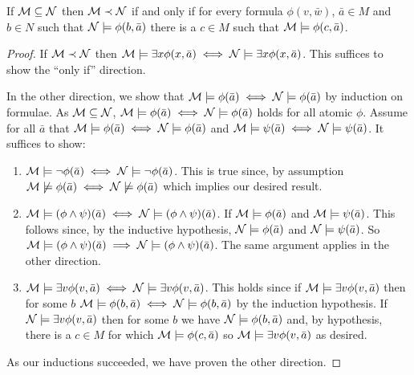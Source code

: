 \begin{theorem}\label{theorem_tarski_vaught_test}
If \(\mathcal{M} \subseteq \mathcal{N}\) then \(\mathcal{M} \prec \mathcal{N}\) if and only if for every formula \(\phi(v, \bar{w})\), \(\bar{a} \in M\) and \(b \in N\) such that \(\mathcal{N} \models \phi(b, \bar{a})\) there is a \(c \in M\) such that \(\mathcal{M} \models \phi(c, \bar{a})\).
\end{theorem}

\begin{proof}
If \(\mathcal{M} \prec \mathcal{N}\) then \(\mathcal{M} \models \exists x \phi(x, \bar{a}) \iff \mathcal{N} \models \exists x \phi(x, \bar{a})\). This suffices to show the ``only if'' direction.

In the other direction, we show that \(\mathcal{M} \models \phi(\bar{a}) \iff \mathcal{N} \models \phi(\bar{a})\) by induction on formulae. 
As \(\mathcal{M} \subseteq \mathcal{N}\), \(\mathcal{M} \models \phi(\bar{a}) \iff \mathcal{N} \models \phi(\bar{a})\) holds for all atomic \(\phi\).
Assume for all \(\bar{a}\) that  \(\mathcal{M} \models \phi(\bar{a}) \iff \mathcal{N} \models \phi(\bar{a})\) and \(\mathcal{M} \models \psi(\bar{a}) \iff \mathcal{N} \models \psi(\bar{a})\).
It suffices to show:
\begin{enumerate}
\item \(\mathcal{M} \models \neg \phi(\bar{a}) \iff \mathcal{N} \models \neg \phi(\bar{a})\). This is true since, by assumption \(\mathcal{M} \not \models \phi(\bar{a}) \iff \mathcal{N} \not \models \phi(\bar{a})\) which implies our desired result. 
\item \(\mathcal{M} \models (\phi\land\psi)(\bar{a}) \iff \mathcal{N} \models (\phi\land\psi)(\bar{a})\). If \(\mathcal{M} \models \phi(\bar{a})\) and \(\mathcal{M} \models \psi(\bar{a})\). This follows since, by the inductive hypothesis,  \(\mathcal{N} \models \phi(\bar{a})\) and \(\mathcal{N} \models \psi(\bar{a})\). So \(\mathcal{M} \models (\phi \land \psi)(\bar{a}) \implies \mathcal{N} \models (\phi \land \psi)(\bar{a})\). The same argument applies in the other direction. 
\item \(\mathcal{M} \models \exists v \phi(v, \bar{a}) \iff \mathcal{N} \models \exists v \phi(v, \bar{a})\). This holds since if \(\mathcal{M} \models \exists v \phi(v, \bar{a})\) then for some \(b\) \(\mathcal{M} \models \phi(b, \bar{a}) \iff \mathcal{N} \models \phi(b, \bar{a})\) by the induction hypothesis. If \(\mathcal{N} \models \exists v \phi(v, \bar{a})\) then for some \(b\) we have \(\mathcal{N} \models \phi(b, \bar{a})\) and, by hypothesis, there is a \(c \in M\) for which \(\mathcal{M} \models \phi(c, \bar{a})\) so \(\mathcal{M} \models \exists v \phi(v, \bar{a})\) as desired.    
\end{enumerate} 
As our inductions succeeded, we have proven the other direction. \end{proof}

